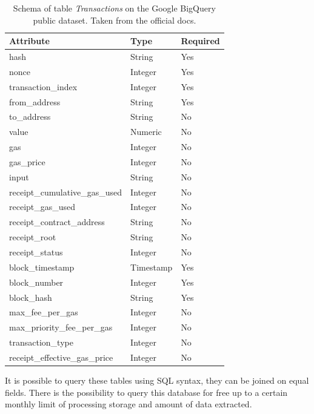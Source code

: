 \begin{table}[H]
\centering
    \begin{tabular}  { m{6cm} m{3cm} m{3cm} } 
    \toprule
    \textbf{Attribute} & \textbf{Type} & \textbf{Required} \\
    \midrule
    hash & String	& Yes		\\		
    nonce & Integer	& Yes \\				
    transaction\_index & Integer	& Yes		\\		
    from\_address & String	& Yes			\\	
    to\_address & String	& No		\\		
    value & Numeric	& No \\				
    gas &  Integer	& No \\				 
    gas\_price &  Integer &	No \\				
    input &  String	& No \\				
    receipt\_cumulative\_gas\_used & Integer & 	No \\				
    receipt\_gas\_used  & Integer	& No \\				
    receipt\_contract\_address & String	& No \\				
    receipt\_root &  String & 	No \\				
    receipt\_status  & Integer & 	No \\				
    block\_timestamp  & Timestamp	 & Yes \\				
    block\_number  & Integer & 	Yes \\				
    block\_hash & String &	Yes \\				
    max\_fee\_per\_gas & Integer	& No \\	
    max\_priority\_fee\_per\_gas & Integer	& No \\		
    transaction\_type & Integer	& No				\\
    receipt\_effective\_gas\_price & Integer	& No	\\
    \bottomrule
\end{tabular}
\caption[Google BigQuery \texttt{Transactions} table]{Schema of table \textit{Transactions} on the Google BigQuery public dataset. Taken from the official docs.}
\label{table:bigquery-transactions}
\end{table}

It is possible to query these tables using SQL syntax, they can be joined on equal fields. There is the possibility to query this database for free up to a certain monthly limit of processing storage and amount of data extracted. 

